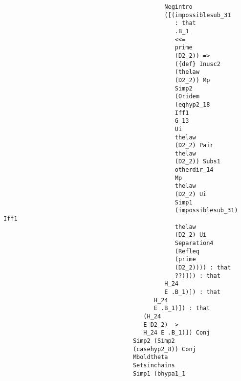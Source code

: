 \documentclass[12pt]{article}
\begin{document}
\begin{verbatim}
                                              Negintro 
                                              ([(impossiblesub_31 
                                                 : that 
                                                 .B_1 
                                                 <<= 
                                                 prime 
                                                 (D2_2)) => 
                                                 ({def} Inusc2 
                                                 (thelaw 
                                                 (D2_2)) Mp 
                                                 Simp2 
                                                 (Oridem 
                                                 (eqhyp2_18 
                                                 Iff1 
                                                 G_13 
                                                 Ui 
                                                 thelaw 
                                                 (D2_2) Pair 
                                                 thelaw 
                                                 (D2_2)) Subs1 
                                                 otherdir_14 
                                                 Mp 
                                                 thelaw 
                                                 (D2_2) Ui 
                                                 Simp1 
                                                 (impossiblesub_31) Iff1 
                                                 thelaw 
                                                 (D2_2) Ui 
                                                 Separation4 
                                                 (Refleq 
                                                 (prime 
                                                 (D2_2)))) : that 
                                                 ??)])) : that 
                                              H_24 
                                              E .B_1)]) : that 
                                           H_24 
                                           E .B_1)]) : that 
                                        (H_24 
                                        E D2_2) -> 
                                        H_24 E .B_1)]) Conj 
                                     Simp2 (Simp2 
                                     (casehyp2_8)) Conj 
                                     Mboldtheta 
                                     Setsinchains 
                                     Simp1 (bhypa1_1 

\end{verbatim}
\end{document}
